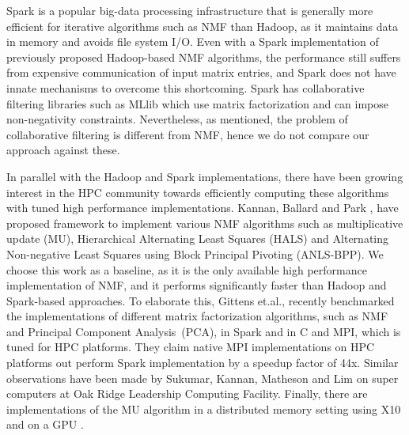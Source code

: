 
Spark \cite{ZCFSS10} is a popular big-data processing infrastructure that is generally more efficient for iterative algorithms such as NMF than Hadoop, as it maintains data in memory and avoids file system I/O.
Even with a Spark implementation of previously proposed Hadoop-based NMF algorithms, the performance still suffers from expensive communication of input matrix entries, and Spark does not have innate mechanisms to overcome this shortcoming. 
Spark has collaborative filtering libraries such as MLlib \cite{meng2015mllib} which use matrix factorization and can impose non-negativity constraints. %
Nevertheless, as mentioned, the problem of collaborative filtering is different from NMF,  hence we do not compare our approach against these.

In parallel with the Hadoop and Spark implementations, there have been growing interest in the HPC community towards efficiently computing these algorithms with tuned high performance implementations. Kannan, Ballard and Park \cite{KBP16, KBP16MPIFAUN}, have proposed \mpifaun framework to implement various NMF algorithms such as multiplicative update (MU), Hierarchical Alternating Least Squares (HALS) and Alternating Non-negative Least Squares using Block Principal Pivoting (ANLS-BPP).
We choose this work as a baseline, as it is the only available high performance implementation of NMF, and it performs significantly faster than Hadoop and Spark-based approaches.
To elaborate this, Gittens et.al., \cite{GDRRGKLMC16} recently benchmarked the implementations of different matrix factorization algorithms, such as NMF and Principal Component Analysis~(PCA), in Spark and in C and MPI, which is tuned for HPC platforms.
They claim native MPI implementations on HPC platforms out perform Spark implementation by a speedup factor of 44x.
Similar observations have been made by Sukumar, Kannan, Matheson and Lim \cite{SKLM16, SMKL16} on super computers at Oak Ridge Leadership Computing Facility. 
Finally, there are implementations of the MU algorithm in a distributed memory setting using X10 \cite{Grove2014} and on a GPU \cite{mejia2015nmf}.


